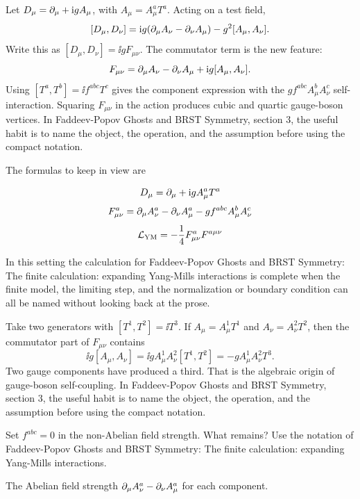 Let \(D_\mu=\partial_\mu+\mathrm i gA_\mu\), with \(A_\mu=A_\mu^aT^a\).  Acting on a test field,
\[
  [D_\mu,D_\nu]
  =
  \mathrm i g(\partial_\mu A_\nu-\partial_\nu A_\mu)-g^2[A_\mu,A_\nu].
\]
Write this as \([D_\mu,D_\nu]=\ii gF_{\mu\nu}\).  The commutator term is the new feature:
\[
  F_{\mu\nu}=\partial_\mu A_\nu-\partial_\nu A_\mu+\mathrm i g[A_\mu,A_\nu].
\]
Using \([T^a,T^b]=\ii f^{abc}T^c\) gives the component expression with the \(gf^{abc}A_\mu^bA_\nu^c\) self-interaction.  Squaring \(F_{\mu\nu}\) in the action produces cubic and quartic gauge-boson vertices.  In Faddeev-Popov Ghosts and BRST Symmetry, section 3, the useful habit is to name the object, the operation, and the assumption before using the compact notation.

The formulas to keep in view are

\[
  D_\mu=\partial_\mu+\mathrm i gA_\mu^aT^a
\]
\[
  F_{\mu\nu}^a=\partial_\mu A_\nu^a-\partial_\nu A_\mu^a-gf^{abc}A_\mu^bA_\nu^c
\]
\[
  \mathcal L_{\mathrm{YM}}=-\frac14F_{\mu\nu}^aF^{a\mu\nu}
\]

In this setting the calculation for Faddeev-Popov Ghosts and BRST Symmetry: The finite calculation: expanding Yang-Mills interactions is complete when the finite model, the limiting step, and the normalization or boundary condition can all be named without looking back at the prose.




\begin{example}
Take two generators with \([T^1,T^2]=\ii T^3\).  If \(A_\mu=A_\mu^1T^1\) and \(A_\nu=A_\nu^2T^2\), then the commutator part of \(F_{\mu\nu}\) contains
\[
  \ii g[A_\mu,A_\nu]=\ii gA_\mu^1A_\nu^2[T^1,T^2]=-gA_\mu^1A_\nu^2T^3.
\]
Two gauge components have produced a third.  That is the algebraic origin of gauge-boson self-coupling.  In Faddeev-Popov Ghosts and BRST Symmetry, section 3, the useful habit is to name the object, the operation, and the assumption before using the compact notation.
\end{example}



\begin{exercise}
Set \(f^{abc}=0\) in the non-Abelian field strength.  What remains?  Use the notation of Faddeev-Popov Ghosts and BRST Symmetry: The finite calculation: expanding Yang-Mills interactions.
\begin{answer}
The Abelian field strength \(\partial_\mu A_\nu^a-\partial_\nu A_\mu^a\) for each component.
\end{answer}
\end{exercise}

